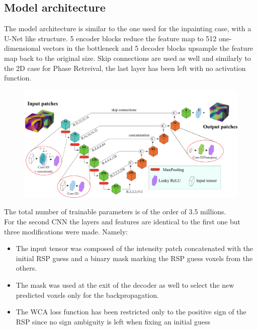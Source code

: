 \subsection{Model architecture}\label{chp:3d_patch_model} 
The model architecture is similar to the one used for the inpainting case, with a U-Net like structure. 
5 encoder blocks reduce the feature map to 512 one-dimensional vectors in the bottleneck and 5 decoder blocks upsample 
the feature map back to the original size. Skip connections are used as well and similarly to the 2D case for Phase Retreival, 
the last layer has been left with no activation function. 

\begin{figure}[H]
    \centering
    \includegraphics[width=\textwidth]{figures/Phasing/PatchModel_inkscape.pdf}
    \caption{}
    \label{fig:2models}
\end{figure}

The total number of trainable parameters is of the order of 3.5 millions. \\
For the second CNN the layers and features are identical to the first one but three modifications were made. Namely:
\begin{itemize}
    \item The input tensor was composed of the intensity patch concatenated with the initial RSP guess and a binary 
    mask marking the RSP guess voxels from the others.
    \item The mask was used at the exit of the decoder as well to 
    select the new predicted voxels only for the backpropagation. 
    \item The WCA loss function has been restricted only to the positive sign of the RSP since no sign ambiguity is left 
    when fixing an initial guess
\end{itemize}

